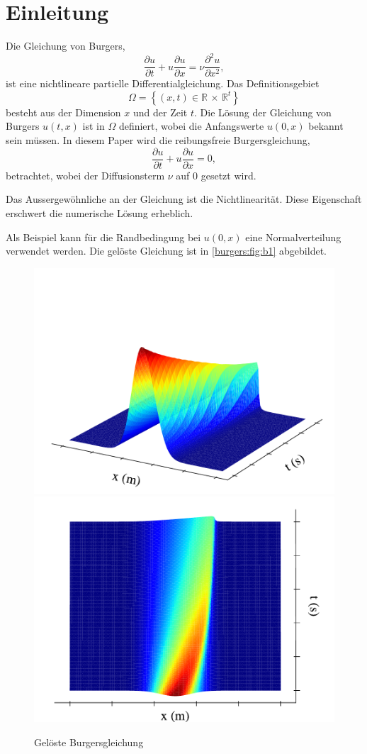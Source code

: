 %
%
\section{Einleitung \label{burgers:section:einleitung}}

	Die Gleichung von Burgers,
	\begin{equation}
		  \frac {\partial u}{\partial t}+u{\frac {\partial u}{\partial x}}=\nu {\frac {\partial ^{2}u}{\partial x^{2}}},
		  \label{burgers:eq_burgers}
	\end{equation}
	ist eine nichtlineare partielle Differentialgleichung.
	Das Definitionsgebiet
	\begin{equation}
		\Omega = \left \{ (x,t) \in  \mathbb{R} \, \times \,  \mathbb{R}^t \right \}
	\end{equation}
	besteht aus der Dimension $x$ und der Zeit $t$.
	Die Lösung der Gleichung von Burgers $u(t,x)$ ist in $\Omega$ definiert, wobei die Anfangswerte $u(0,x)$ bekannt sein müssen.
	In diesem Paper wird die reibungsfreie Burgersgleichung,
	\begin{equation}
		\frac {\partial u}{\partial t}+u{\frac {\partial u}{\partial x}}=0,
		\label{burgers:eq_invisid_burgers}
	\end{equation}
	betrachtet, wobei der Diffusionsterm $\nu$ auf 0 gesetzt wird.


	Das Aussergewöhnliche an der Gleichung ist die Nichtlinearität. Diese Eigenschaft erschwert die numerische L\"osung erheblich.

	Als Beispiel kann f\"ur die Randbedingung bei $u(0,x)$ eine Normalverteilung verwendet werden.
	Die gel\"oste Gleichung ist in \autoref{burgers:fig:b1} abgebildet.

	    \begin{figure}
		\centering
		\includegraphics[width=.49\textwidth]{papers/burgers/BurgersEquation/images/Implicit_front.pdf}
		\includegraphics[width=.49\textwidth]{papers/burgers/BurgersEquation/images/Implicit_top.pdf}
		\caption{Gel\"oste Burgersgleichung}
		\label{burgers:fig:b1}
		\end{figure}


